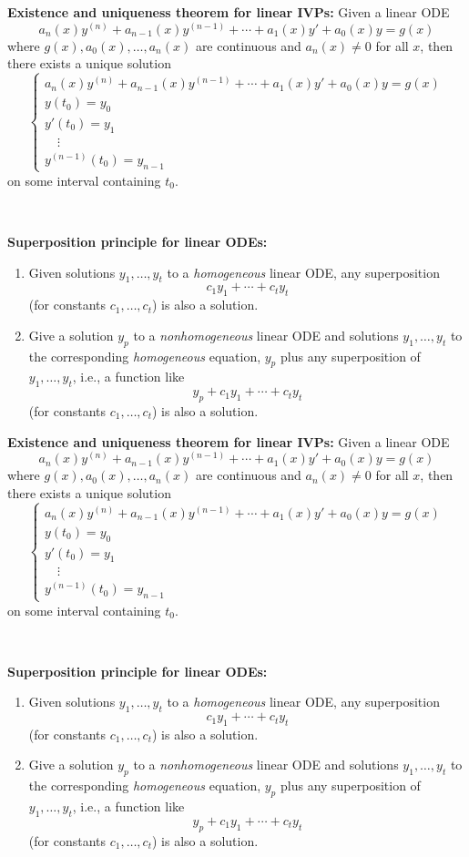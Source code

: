 \documentclass[12pt]{amsart}
\begin{document}
\newpage

\noindent \textbf{Existence and uniqueness theorem for linear IVPs:}
Given a linear ODE
\[ a_n(x) y^{(n)} + a_{n-1}(x) y^{(n-1)} + \cdots + a_1(x) y' + a_0(x) y = g(x)\]
where $g(x), a_0(x), \dots, a_n(x)$ are continuous and $a_n(x)\neq 0$ for all $x$, then there exists a unique solution
\[ \begin{cases} 
a_n(x) y^{(n)} + a_{n-1}(x) y^{(n-1)} + \cdots + a_1(x) y' + a_0(x) y = g(x) \\
y(t_0) = y_0\\
y'(t_0) = y_1 \\
 \quad  \vdots\\
y^{(n-1)}(t_0) = y_{n-1}
\end{cases}\]
on some interval containing $t_0$.

\

\noindent \textbf{Superposition principle for linear ODEs:}
\begin{enumerate}
\item Given solutions $y_1,\dots,y_t$ to a \emph{homogeneous} linear ODE, any superposition
\[c_1 y_1 + \cdots + c_t y_t \] (for constants $c_1,\dots,c_t$) is also a solution.
\item Give a solution $y_p$ to a \emph{nonhomogeneous} linear ODE and solutions $y_1,\dots,y_t$ to the corresponding \emph{homogeneous} equation, $y_p$ plus any superposition of $y_1,\dots,y_t$, i.e., a function like \[ y_p + c_1 y_1 + \cdots + c_t y_t\]  (for constants $c_1,\dots,c_t$) is also a solution.
\end{enumerate}


\vfill


\noindent \textbf{Existence and uniqueness theorem for linear IVPs:}
Given a linear ODE
\[ a_n(x) y^{(n)} + a_{n-1}(x) y^{(n-1)} + \cdots + a_1(x) y' + a_0(x) y = g(x)\]
where $g(x), a_0(x), \dots, a_n(x)$ are continuous and $a_n(x)\neq 0$ for all $x$, then there exists a unique solution
\[ \begin{cases} 
a_n(x) y^{(n)} + a_{n-1}(x) y^{(n-1)} + \cdots + a_1(x) y' + a_0(x) y = g(x) \\
y(t_0) = y_0\\
y'(t_0) = y_1 \\
 \quad  \vdots\\
y^{(n-1)}(t_0) = y_{n-1}
\end{cases}\]
on some interval containing $t_0$.

\

\noindent \textbf{Superposition principle for linear ODEs:}
\begin{enumerate}
\item Given solutions $y_1,\dots,y_t$ to a \emph{homogeneous} linear ODE, any superposition
\[c_1 y_1 + \cdots + c_t y_t \] (for constants $c_1,\dots,c_t$) is also a solution.
\item Give a solution $y_p$ to a \emph{nonhomogeneous} linear ODE and solutions $y_1,\dots,y_t$ to the corresponding \emph{homogeneous} equation, $y_p$ plus any superposition of $y_1,\dots,y_t$, i.e., a function like \[ y_p + c_1 y_1 + \cdots + c_t y_t\]  (for constants $c_1,\dots,c_t$) is also a solution.
\end{enumerate}
\end{document}
